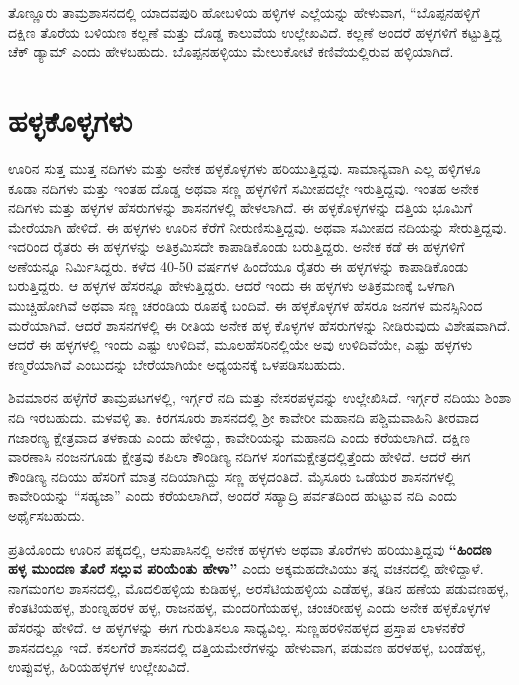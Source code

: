 ತೊಣ್ಣೂರು ತಾಮ್ರಶಾಸನದಲ್ಲಿ ಯಾದವಪುರಿ ಹೋಬಳಿಯ ಹಳ್ಳಿಗಳ ಎಲ್ಲೆಯನ್ನು ಹೇಳುವಾಗ, “ಬೊಪ್ಪನಹಳ್ಳಿಗೆ ದಕ್ಷಿಣ ತೊರೆಯ ಬಳಿಯಣ ಕಲ್ಲಣೆ ಮತ್ತು ದೊಡ್ಡ ಕಾಲುವೆಯ ಉಲ್ಲೇಖವಿದೆ. ಕಲ್ಲಣೆ ಅಂದರೆ ಹಳ್ಳಗಳಿಗೆ ಕಟ್ಟುತ್ತಿದ್ದ ಚೆಕ್​ ಡ್ಯಾಮ್ ಎಂದು ಹೇಳಬಹುದು. ಬೊಪ್ಪನಹಳ್ಳಿಯು ಮೇಲುಕೋಟೆ ಕಣಿವೆಯಲ್ಲಿರುವ ಹಳ್ಳಿಯಾಗಿದೆ.


\section{ಹಳ್ಳಕೊಳ್ಳಗಳು}

ಊರಿನ ಸುತ್ತ ಮುತ್ತ ನದಿಗಳು ಮತ್ತು ಅನೇಕ ಹಳ್ಳಕೊಳ್ಳಗಳು ಹರಿಯುತ್ತಿದ್ದವು. ಸಾಮಾನ್ಯವಾಗಿ ಎಲ್ಲ ಹಳ್ಳಿಗಳೂ ಕೂಡಾ ನದಿಗಳು ಮತ್ತು ಇಂತಹ ದೊಡ್ಡ ಅಥವಾ ಸಣ್ಣ ಹಳ್ಳಗಳಿಗೆ ಸಮೀಪದಲ್ಲೇ ಇರುತ್ತಿದ್ದವು. ಇಂತಹ ಅನೇಕ ನದಿಗಳು ಮತ್ತು ಹಳ್ಳಗಳ ಹೆಸರುಗಳನ್ನು ಶಾಸನಗಳಲ್ಲಿ ಹೇಳಲಾಗಿದೆ. ಈ ಹಳ್ಳಕೊಳ್ಳಗಳನ್ನು ದತ್ತಿಯ ಭೂಮಿಗೆ ಮೇರೆಯಾಗಿ ಹೇಳಿದೆ. ಈ ಹಳ್ಳಗಳು ಊರಿನ ಕೆರೆಗೆ ನೀರುಣಿಸುತ್ತಿದ್ದವು. ಅಥವಾ ಸಮೀಪದ ನದಿಯನ್ನು ಸೇರುತ್ತಿದ್ದವು. ಇದರಿಂದ ರೈತರು ಈ ಹಳ್ಳಗಳನ್ನು ಅತಿಕ್ರಮಿಸದೇ ಕಾಪಾಡಿಕೊಂಡು ಬರುತ್ತಿದ್ದರು. ಅನೇಕ ಕಡೆ ಈ ಹಳ್ಳಗಳಿಗೆ ಅಣೆಯನ್ನೂ ನಿರ್ಮಿಸಿದ್ದರು. ಕಳೆದ 40-50 ವರ್ಷಗಳ ಹಿಂದೆಯೂ ರೈತರು ಈ ಹಳ್ಳಗಳನ್ನು ಕಾಪಾಡಿಕೊಂಡು ಬರುತ್ತಿದ್ದರು. ಆ ಹಳ್ಳಗಳ ಹೆಸರನ್ನೂ ಹೇಳುತ್ತಿದ್ದರು. ಆದರೆ ಇಂದು ಈ ಹಳ್ಳಗಳು ಅತಿಕ್ರಮಣಕ್ಕೆ ಒಳಗಾಗಿ ಮುಚ್ಚಿಹೋಗಿವೆ ಅಥವಾ ಸಣ್ಣ ಚರಂಡಿಯ ರೂಪಕ್ಕೆ ಬಂದಿವೆ. ಈ ಹಳ್ಳಕೊಳ್ಳಗಳ ಹೆಸರೂ ಜನಗಳ ಮನಸ್ಸಿನಿಂದ ಮರೆಯಾಗಿವೆ. ಆದರೆ ಶಾಸನಗಳಲ್ಲಿ ಈ ರೀತಿಯ ಅನೇಕ ಹಳ್ಳ ಕೊಳ್ಳಗಳ ಹೆಸರುಗಳನ್ನು ನೀಡಿರುವುದು ವಿಶೇಷವಾಗಿದೆ. ಆದರೆ ಈ ಹಳ್ಳಗಳಲ್ಲಿ ಇಂದು ಎಷ್ಟು ಉಳಿದಿವೆ, ಮೂಲಹೆಸರಿನಲ್ಲಿಯೇ ಅವು ಉಳಿದಿವೆಯೇ, ಎಷ್ಟು ಹಳ್ಳಗಳು ಕಣ್ಮರೆಯಾಗಿವೆ ಎಂಬುದನ್ನು ಬೇರೆಯಾಗಿಯೇ ಅಧ್ಯಯನಕ್ಕೆ ಒಳಪಡಿಸಬಹುದು.

ಶಿವಮಾರನ ಹಳ್ಳೆಗೆರೆ ತಾಮ್ರಪಟಗಳಲ್ಲಿ, ಇರ್ಗ್ಗರೆ ನದಿ ಮತ್ತು ನೇಸರಪಳ್ಳವನ್ನು ಉಲ್ಲೇಖಿಸಿದೆ. ಇರ್ಗ್ಗರೆ ನದಿಯು ಶಿಂಶಾ ನದಿ ಇರಬಹುದು. ಮಳವಳ್ಳಿ ತಾ. ಕಿರಗಸೂರು ಶಾಸನದಲ್ಲಿ ಶ‍್ರೀ ಕಾವೇರೀ ಮಹಾನದಿ ಪಶ್ಚಿಮವಾಹಿನಿ ತೀರವಾದ ಗಜಾರಣ್ಯ ಕ್ಷೇತ್ರವಾದ ತಳಕಾಡು ಎಂದು ಹೇಳಿದ್ದು, ಕಾವೇರಿಯನ್ನು ಮಹಾನದಿ ಎಂದು ಕರೆಯಲಾಗಿದೆ. ದಕ್ಷಿಣ ವಾರಣಾಸಿ ನಂಜನಗೂಡು ಕ್ಷೇತ್ರವು ಕಪಿಲಾ ಕೌಂಡಿಣ್ಯ ನದಿಗಳ ಸಂಗಮಕ್ಷೇತ್ರದಲ್ಲಿತ್ತೆಂದು ಹೇಳಿದೆ. ಆದರೆ ಈಗ ಕೌಂಡಿಣ್ಯ ನದಿಯು ಹೆಸರಿಗೆ ಮಾತ್ರ ನದಿಯಾಗಿದ್ದು ಸಣ್ಣ ಹಳ್ಳದಂತಿದೆ. ಮೈಸೂರು ಒಡೆಯರ ಶಾಸನಗಳಲ್ಲಿ ಕಾವೇರಿಯನ್ನು “ಸಹ್ಯಜಾ” ಎಂದು ಕರೆಯಲಾಗಿದೆ, ಅಂದರೆ ಸಹ್ಯಾದ್ರಿ ಪರ್ವತದಿಂದ ಹುಟ್ಟುವ ನದಿ ಎಂದು ಅರ್ಥೈಸಬಹುದು.

ಪ್ರತಿಯೊಂದು ಊರಿನ ಪಕ್ಕದಲ್ಲಿ, ಆಸುಪಾಸಿನಲ್ಲಿ ಅನೇಕ ಹಳ್ಳಗಳು ಅಥವಾ ತೊರೆಗಳು ಹರಿಯುತ್ತಿದ್ದವು \textbf{“ಹಿಂದಣ ಹಳ್ಳ ಮುಂದಣ ತೊರೆ ಸಲ್ಲುವ ಪರಿಯೆಂತು ಹೇಳಾ”} ಎಂದು ಅಕ್ಕಮಹದೇವಿಯು ತನ್ನ ವಚನದಲ್ಲಿ ಹೇಳಿದ್ದಾಳೆ. ನಾಗಮಂಗಲ ಶಾಸನದಲ್ಲಿ, ಮೊದಲಿಹಳ್ಳಿಯ ಕುಡಿಹಳ್ಳ, ಅರಸೆಟಿಯಹಳ್ಳಿಯ ಎಡೆಹಳ್ಳ, ತಡಿನ ಹಣೆಯ ಪಡುವಣಹಳ್ಳ, ಕೆಂತಟಿಯಹಳ್ಳ, ಶುಂಣ್ನಹರಳ ಹಳ್ಳ, ರಾಜನಹಳ್ಳ, ಮಂದರಿಗೆಯಹಳ್ಳ, ಚಂಚರೀಹಳ್ಳ ಎಂದು ಅನೇಕ ಹಳ್ಳಕೊಳ್ಳಗಳ ಹೆಸರನ್ನು ಹೇಳಿದೆ. ಆ ಹಳ್ಳಗಳನ್ನು ಈಗ ಗುರುತಿಸಲೂ ಸಾಧ್ಯವಿಲ್ಲ. ಸುಣ್ಣಹರಳಿನಹಳ್ಳದ ಪ್ರಸ್ತಾಪ ಲಾಳನಕೆರೆ ಶಾಸನದಲ್ಲೂ ಇದೆ. ಕಸಲಗೆರೆ ಶಾಸನದಲ್ಲಿ ದತ್ತಿಯಮೇರೆಗಳನ್ನು ಹೇಳುವಾಗ, ಪಡುವಣ ಹರಳಹಳ್ಳ, ಬಂಡೆಹಳ್ಳ, ಉಪ್ಪುವಳ್ಳ, ಹಿರಿಯಹಳ್ಳಗಳ ಉಲ್ಲೇಖವಿದೆ.

